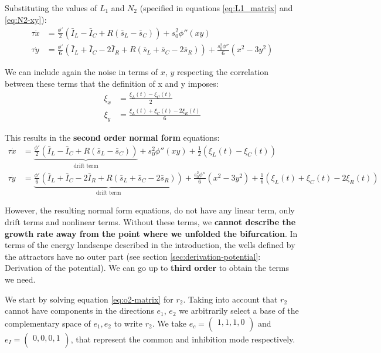 \documentclass[12,twoside]{TFG-GM}
\theoremstyle{definition}
\theoremstyle{remark}
\begin{document}
Substituting the values of $L_1$ and $N_2$ (specified in equations \eqref{eq:L1_matrix} and \eqref{eq:N2-xy}): 
\begin{align*}
\tau \dot{x} &= \frac{\phi'}{2}(\bar{I}_L -  \bar{I}_C + R (\bar{s}_L - \bar{s}_C)) + s_0^2\phi''(xy)\\[8pt]
\tau \dot{y} &= \frac{\phi'}{6}(\bar{I}_L +  \bar{I}_C - 2 \bar{I}_R +  R (\bar{s}_L+ \bar{s}_C -2\bar{s}_R) ) + \frac{s_0^2\phi''}{6}(x^2-3y^2) 
\end{align*}

We can include again the noise in terms of $x$, $y$ respecting the correlation between these terms that the definition of x and y imposes:
\[\begin{aligned}
\xi_{x} &= \frac{\xi_{L}(t)-\xi_{C}(t)}{2}\\
\xi_{y} &= \frac{\xi_{L}(t)+\xi_{C}(t)-2\xi_{R}(t)}{6}
\end{aligned}
\]

This results in the \textbf{second order normal form} equations:
\begin{subequations}
\begin{align}
\tau \dot{x} &= \underbrace{\frac{\phi'}{2}(\bar{I}_L -  \bar{I}_C + R (\bar{s}_L - \bar{s}_C))}_{\text{drift term}} + s_0^2\phi''(xy) + \frac{1}{2}(\xi_L(t)-\xi_C(t)) \label{eq:system-o2-x}\\[8pt]
\tau \dot{y} &= \underbrace{\frac{\phi'}{6}(\bar{I}_L +  \bar{I}_C - 2 \bar{I}_R +  R (\bar{s}_L+ \bar{s}_C -2\bar{s}_R) )}_{\text{drift term}} + \frac{s_0^2\phi''}{6}(x^2-3y^2) + \frac{1}{6}(\xi_L(t)+\xi_C(t)-2\xi_R(t))\label{eq:system-o2-y}
\end{align}
\label{eq:system-o2}
\end{subequations}


However, the resulting normal form equations, do not have any linear term, only drift terms and nonlinear terms. Without these terms, we \textbf{cannot describe the growth rate away from the point where we unfolded the bifurcation}. In terms of the energy landscape described in the introduction, the wells defined by the attractors have no outer part (see section \ref{sec:derivation-potential}: Derivation of the potential). We can go up to \textbf{third order} to obtain the terms we need.

We start by solving equation \eqref{eq:o2-matrix} for $r_2$. Taking into account that $r_2$ cannot have components in the directions $e_1$, $e_2$ we arbitrarily select a base of the complementary space of $e_1,e_2$ to write $r_2$. We take $e_c = \begin{pmatrix}
1,1,1,0\\
\end{pmatrix}$ and $e_I = \begin{pmatrix}0,0,0,1\\\end{pmatrix}$, that represent the common and inhibition mode respectively. 
\end{document}
